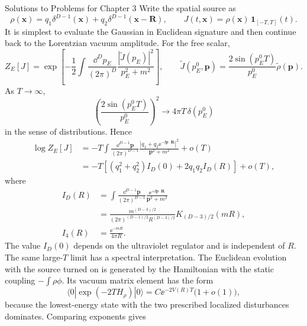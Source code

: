 \begin{bankssolutions}{Solutions to Problems for Chapter 3}
Write the spatial source as
\begin{equation*}
 \rho(\mathbf x)=q_1\delta^{D-1}(\mathbf x)+q_2\delta^{D-1}(\mathbf x-\mathbf R),
 \qquad J(t,\mathbf x)=\rho(\mathbf x)\,\mathbf 1_{[-T,T]}(t).
\end{equation*}
It is simplest to evaluate the Gaussian in Euclidean signature and then
continue back to the Lorentzian vacuum amplitude.  For the free scalar,
\begin{equation*}
 Z_E[J]=\exp\!\left[-\frac12\int\frac{\dd^D p_E}{(2\pi)^D}
 \frac{|\widetilde J(p_E)|^2}{p_E^2+m^2}\right],
 \qquad
 \widetilde J(p_E^0,\mathbf p)=\frac{2\sin(p_E^0T)}{p_E^0}\widetilde\rho(\mathbf p).
\end{equation*}
As $T\to\infty$,
\begin{equation*}
 \left(\frac{2\sin(p_E^0T)}{p_E^0}\right)^2
 \longrightarrow 4\pi T\,\delta(p_E^0)
\end{equation*}
in the sense of distributions.  Hence
\begin{align*}
 \log Z_E[J]
 &=-T\int\frac{\dd^{D-1}\mathbf p}{(2\pi)^{D-1}}
 \frac{|q_1+q_2\ee^{-\ii\mathbf p\cdot\mathbf R}|^2}{\mathbf p^2+m^2}+o(T)\\
 &=-T\left[(q_1^2+q_2^2)I_D(0)+2q_1q_2I_D(R)\right]+o(T),
\end{align*}
where
\begin{equation*}
\begin{aligned}
 I_D(R)&=\int\frac{\dd^{D-1}\mathbf p}{(2\pi)^{D-1}}
 \frac{\ee^{+\ii\mathbf p\mathbin{\cdot}\mathbf R}}{\mathbf p^2+m^2}\\
 &=\frac{m^{(D-3)/2}}{(2\pi)^{(D-1)/2}R^{(D-3)/2}}
 K_{(D-3)/2}(mR),\\
 I_4(R)&=\frac{\ee^{-mR}}{4\pi R}.
\end{aligned}
\end{equation*}
The value $I_D(0)$ depends on the ultraviolet regulator and is independent of
$R$.  The same large-$T$ limit has a spectral interpretation.  The Euclidean
evolution with the source turned on is generated by the Hamiltonian with the
static coupling $-\int\rho\phi$.  Its vacuum matrix element has the form
\begin{equation*}
 \langle0|\exp(-2T H_\rho)|0\rangle
 =C\ee^{-2V(R)T}\bigl(1+o(1)\bigr),
\end{equation*}
because the lowest-energy state with the two prescribed localized
disturbances dominates.  Comparing exponents gives
\begin{equation*}

\end{equation*}
\end{bankssolutions}
